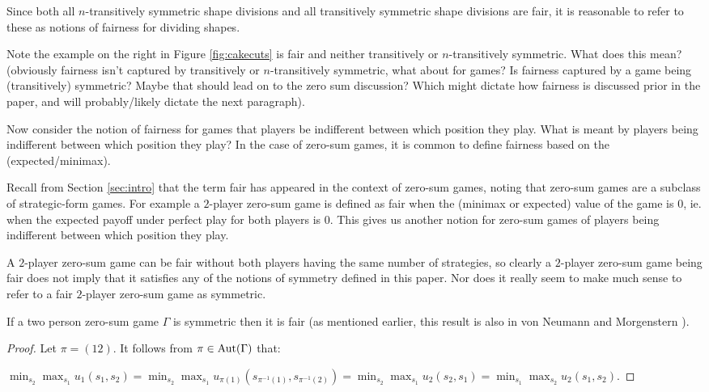 Since both all $n$-transitively symmetric shape divisions and all transitively symmetric shape divisions are fair, it is reasonable to refer to these as notions of fairness for dividing shapes. 

Note the example on the right in Figure \ref{fig:cakecuts} is fair and neither transitively or $n$-transitively symmetric. What does this mean? (obviously fairness isn't captured by transitively or $n$-transitively symmetric, what about for games? Is fairness captured by a game being (transitively) symmetric? Maybe that should lead on to the zero sum discussion? Which might dictate how fairness is discussed prior in the paper, and will probably/likely dictate the next paragraph).

Now consider the notion of fairness for games that players be indifferent between which position they play. What is meant by players being indifferent between which position they play? In the case of zero-sum games, it is common to define fairness based on the (expected/minimax).

Recall from Section \ref{sec:intro} that the term fair has appeared in the context of zero-sum games, noting that zero-sum games are a subclass of strategic-form games. For example a $2$-player zero-sum game is defined as fair when the (minimax or expected) value of the game is $0$, ie. when the expected payoff under perfect play for both players is $0$. This gives us another notion for zero-sum games of players being indifferent between which position they play. 

A $2$-player zero-sum game can be fair without both players having the same number of strategies, so clearly a $2$-player zero-sum game being fair does not imply that it satisfies any of the notions of symmetry defined in this paper. Nor does it really seem to make much sense to refer to a fair $2$-player zero-sum game as symmetric. 

\begin{theorem}
	If a two person zero-sum game $\Gamma$ is symmetric then it is fair (as mentioned earlier, this result is also in von Neumann and Morgenstern \cite[Pages 165-166]{VNM}).
	\begin{proof}
		Let $\pi = (12)$. It follows from $\pi \in \operatorname*{Aut}(\Gamma)$ that:
		
		 $\displaystyle\min_{s_2}\max_{s_1}u_1(s_1, s_2) = \min_{s_2}\max_{s_1}u_{\pi(1)}(s_{\pi^{-1}(1)}, s_{\pi^{-1}(2)}) = \min_{s_2}\max_{s_1}u_2(s_2, s_1) = \min_{s_1}\max_{s_2}u_2(s_1, s_2)$.
	\end{proof}
\end{theorem}


